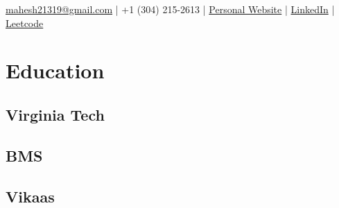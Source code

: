 \documentclass[]{resume-openfont}
\begin{document}
%
%
\lastupdated

%
%
{ 
\href{mailto:mahesh21319@gmail.com}{mahesh21319@gmail.com} | 
+1 (304) 215-2613 | 
\href{https://mahesh-maddhuru.github.io/}{Personal Website} |
\href{http://www.linkedin.com/in/mahesh-m97}{LinkedIn} | 
\href{https://leetcode.com/mahm/}{Leetcode}
}

%
%

\begin{minipage}[t]{0.33\textwidth} 


\section{Education} 

\subsection{Virginia Tech}
\sectionsep

\subsection{BMS}
\sectionsep

\subsection{Vikaas}
\sectionsep




\end{minipage}
\end{document}

